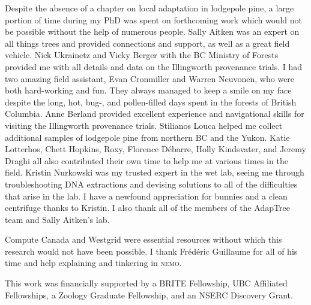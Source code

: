 Despite the absence of a chapter on local adaptation in lodgepole pine, a large portion of time during my PhD was spent on forthcoming work which would not be possible without the help of numerous people. Sally Aitken was an expert on all things trees and provided connections and support, as well as a great field vehicle. Nick Ukrainetz and Vicky Berger with the BC Ministry of Forests provided me with all details and data on the Illingworth provenance trials. I had two amazing field assistant, Evan Cronmiller and Warren Neuvonen, who were both hard-working and fun. They always managed to keep a smile on my face despite the long, hot, bug-, and pollen-filled days spent in the forests of British Columbia. Anne Berland provided excellent experience and navigational skills for visiting the Illingworth provenance trials. Stilianos Louca helped me collect additional samples of lodgepole pine from northern BC and the Yukon. Katie Lotterhos, Chett Hopkins, Roxy, Florence D\'ebarre, Holly Kindsvater, and Jeremy Draghi all also contributed their own time to help me at various times in the field. Kristin Nurkowski was my trusted expert in the wet lab, seeing me through troubleshooting DNA extractions and devising solutions to all of the difficulties that arise in the lab. I have a newfound appreciation for bunnies and a clean centrifuge thanks to Kristin. I also thank all of the members of the AdapTree team and Sally Aitken's lab.

Compute Canada and Westgrid were essential resources without which this research would not have been possible. I thank Fr\'ed\'eric Guillaume for all of his time and help explaining and tinkering in \textsc{nemo}.

This work was financially supported by a BRITE Fellowship, UBC Affiliated Fellowships, a Zoology Graduate Fellowship, and an NSERC Discovery Grant. 
